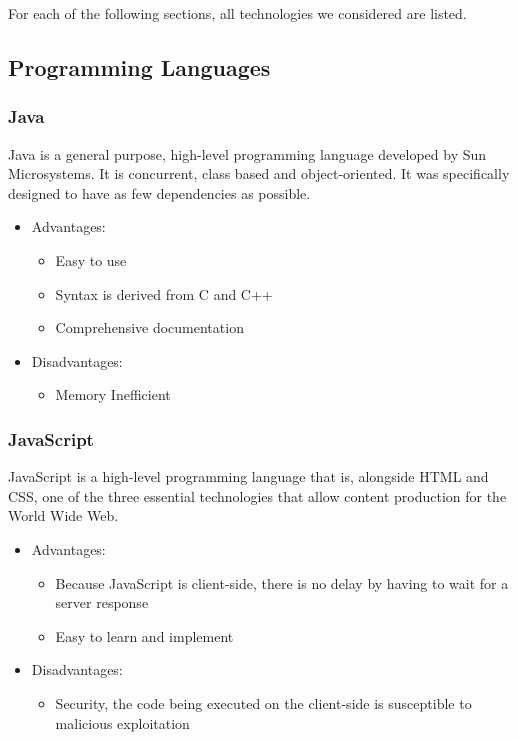 \documentclass{article}
\begin{document}
	For each of the following sections, all technologies we considered are listed.
	
	\subsection{Programming Languages}
			\subsubsection{Java}
				Java is a general purpose, high-level programming language developed by Sun Microsystems. It is concurrent, class based and object-oriented. It was specifically designed to have as few dependencies as possible.
				
				\begin{itemize}			
					\item Advantages:
						\begin{itemize}
							\item Easy to use
							\item Syntax is derived from C and C++
							\item Comprehensive documentation
						\end{itemize}
						
					\item Disadvantages:
						\begin{itemize}
							\item Memory Inefficient
						\end{itemize}
				\end{itemize}
				
			\subsubsection{JavaScript}
				JavaScript is a high-level programming language that is, alongside HTML and CSS, one of the three essential technologies that allow content production for the World Wide Web.
				
				\begin{itemize}
					\item Advantages:
						\begin{itemize}
							\item  Because JavaScript is client-side, there is no delay by having to wait for a server response
							\item Easy to learn and implement
						\end{itemize}
						
					\item Disadvantages:
						\begin{itemize}
							\item Security, the code being executed on the client-side is susceptible to malicious exploitation
						\end{itemize}
				\end{itemize}
				
\end{document}
